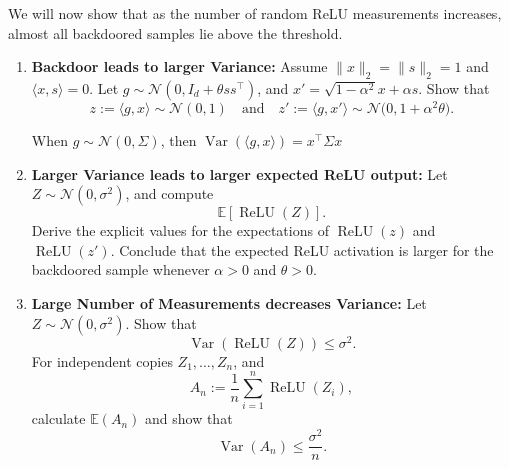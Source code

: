 \documentclass[11pt]{article}
\begin{document}
\begin{exercise}
\label{ex:relu-backdoor}
We will now show that as the number of random ReLU measurements increases, almost all backdoored samples lie above the threshold.

\begin{enumerate}[label=(\alph*)]
    \item \textbf{Backdoor leads to larger Variance:}
Assume \(\|x\|_2=\|s\|_2=1\) and \(\langle x,s\rangle=0\). Let
\(g \sim \mathcal N(0,I_d+\theta ss^\top)\), and \(x' = \sqrt{1-\alpha^2}x+\alpha s\).
Show that
\[
    z := \langle g,x\rangle \sim \mathcal N(0,1)
    \quad \text{and} \quad
    z' := \langle g,x'\rangle
    \sim \mathcal N\bigl(0,1+\alpha^2\theta\bigr).
\]
\begin{hint}
When $g \sim \mathcal N(0, \Sigma)$, then $\operatorname{Var}(\langle g,x\rangle) = x^\top \Sigma x $
\end{hint}

\item \textbf{Larger Variance leads to larger expected ReLU output:}
Let \(Z \sim \mathcal N(0,\sigma^2)\), and compute
\[\mathbb E[\operatorname{ReLU}(Z)].\]
Derive the explicit values for the expectations of $\operatorname{ReLU}(z)$ and $\operatorname{ReLU}(z')$. Conclude that the expected ReLU activation is larger for the backdoored
sample whenever \(\alpha > 0\) and \(\theta > 0\).


\item \textbf{Large Number of Measurements decreases Variance:}
Let \(Z\sim \mathcal N(0,\sigma^2)\). Show that
\[
    \operatorname{Var}(\operatorname{ReLU}(Z))
    \leq \sigma^2.
\]
For independent copies \(Z_1,\dots,Z_n\), and
\[
   A_n := \frac{1}{n}\sum_{i=1}^n \operatorname{ReLU}(Z_i),
\]
calculate
$ \mathbb E \left(
        A_n
    \right)
    $
and show that
\[
\operatorname{Var}\left(
        A_n
    \right)
    \leq \frac{\sigma^2}{n}.
\]


\end{enumerate}
\end{exercise}
\end{document}

